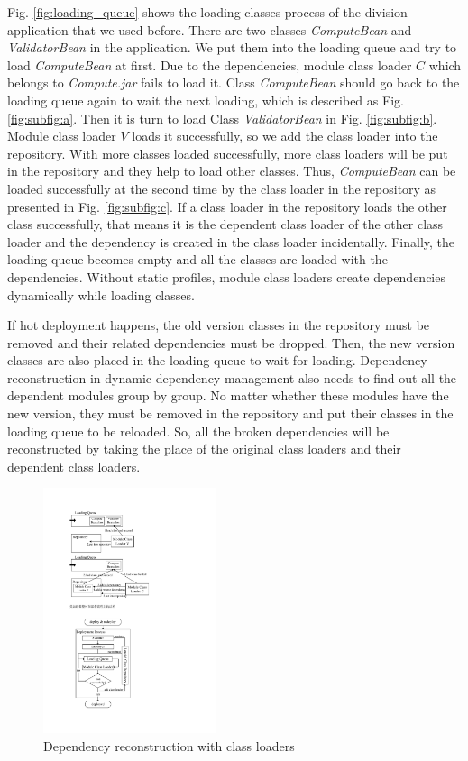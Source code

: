 \documentclass[conference]{IEEEtran}
\begin{document}
Fig. \ref{fig:loading_queue} shows the loading classes process of the division application that we used before. 
There are two classes \emph{ComputeBean} and \emph{ValidatorBean} in the application. 
We put them into the loading queue and try to load \emph{ComputeBean} at first. 
Due to the dependencies, module class loader $C$ which belongs to \emph{Compute.jar} fails to load it. 
Class \emph{ComputeBean} should go back to the loading queue again to wait the next loading, which is described as Fig. \ref{fig:subfig:a}. 
Then it is turn to load Class \emph{ValidatorBean} in Fig. \ref{fig:subfig:b}. 
Module class loader $V$ loads it successfully, so we add the class loader into the repository. 
With more classes loaded successfully, more class loaders will be put in the repository and they help to load other classes. 
Thus, \emph{ComputeBean} can be loaded successfully at the second time by the class loader in the repository as presented in Fig. \ref{fig:subfig:c}.
If a class loader in the repository loads the other class successfully, that means it is the dependent class loader of the other class loader and the dependency is created in the class loader incidentally. 
Finally, the loading queue becomes empty and all the classes are loaded with the dependencies.
Without static profiles, module class loaders create dependencies dynamically while loading classes.

If hot deployment happens, the old version classes in the repository must be removed and their related dependencies must be dropped. 
Then, the new version classes are also placed in the loading queue to wait for loading. 
Dependency reconstruction in dynamic dependency management also needs to find out all the dependent modules group by group. 
No matter whether these modules have the new version, they must be removed in the repository and put their classes in the loading queue to be reloaded. 
So, all the broken dependencies will be reconstructed by taking the place of the original class loaders and their dependent class loaders. 

\begin{figure}[ht]
\centering
\includegraphics[width=2.0in]{ProcessReconstructionCL.pdf}
\caption{Dependency reconstruction with class loaders}
\label{fig:reconstruction_CL}
\end{figure}
\end{document}
